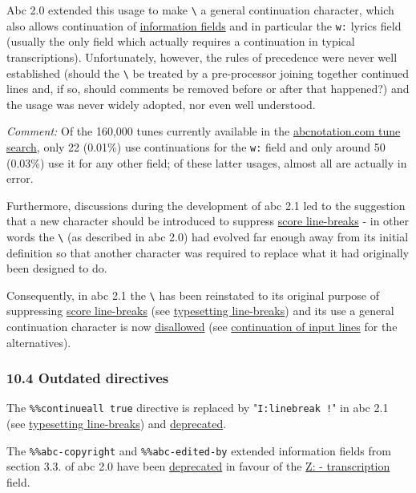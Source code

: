 Abc 2.0 extended this usage to make \texttt{\textbackslash{}} a general
continuation character, which also allows continuation of
\protect\hyperlink{information_field_definition}{information fields} and
in particular the \texttt{w:} lyrics field (usually the only field which
actually requires a continuation in typical transcriptions).
Unfortunately, however, the rules of precedence were never well
established (should the \texttt{\textbackslash{}} be treated by a
pre-processor joining together continued lines and, if so, should
comments be removed before or after that happened?) and the usage was
never widely adopted, nor even well understood.

\emph{Comment:} Of the 160,000 tunes currently available in the
\href{http://abcnotation.com/search}{abcnotation.com tune search}, only
22 (0.01\%) use continuations for the \texttt{w:} field and only around
50 (0.03\%) use it for any other field; of these latter usages, almost
all are actually in error.

Furthermore, discussions during the development of abc 2.1 led to the
suggestion that a new character should be introduced to suppress
\protect\hyperlink{score_line-break_definition}{score line-breaks} - in
other words the \texttt{\textbackslash{}} (as described in abc 2.0) had
evolved far enough away from its initial definition so that another
character was required to replace what it had originally been designed
to do.

Consequently, in abc 2.1 the \texttt{\textbackslash{}} has been
reinstated to its original purpose of suppressing
\protect\hyperlink{score_line-break_definition}{score line-breaks} (see
\protect\hyperlink{typesetting_line-breaks}{typesetting line-breaks})
and its use a general continuation character is now
\protect\hyperlink{outdated_syntax}{disallowed} (see
\protect\hyperlink{continuation_of_input_lines}{continuation of input
lines} for the alternatives).

\hypertarget{outdated_directives}{\subsubsection{10.4 Outdated
directives}\label{outdated_directives}}

The \texttt{\%\%continueall\ true} directive is replaced by
"\texttt{I:linebreak\ !}" in abc 2.1 (see
\protect\hyperlink{typesetting_line-breaks}{typesetting line-breaks})
and \protect\hyperlink{outdated_syntax}{deprecated}.

The \texttt{\%\%abc-copyright} and \texttt{\%\%abc-edited-by} extended
information fields from section 3.3. of abc 2.0 have been
\protect\hyperlink{outdated_syntax}{deprecated} in favour of the
\protect\hyperlink{ztranscription}{Z: - transcription} field.

